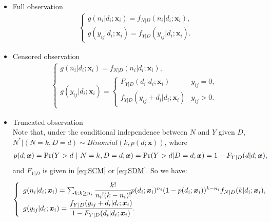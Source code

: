 \documentclass[11pt]{article}
\newcommand{\rev}[1]{{\color{blue}#1}}
\begin{document}
\begin{itemize}
        \item {Full observation}
        \begin{align} \label{eq:fr}
       	\left\{
       	\begin{array}{l}
       	g(n_i|d_i;\bm{x}_i) = f_{N|D}(n_i|d_i;\bm{x}_i), \\
	g(y_{ij}|d_i;\bm{x}_i) = f_{Y|D}({y_{ij}}|d_i;\bm{x}_i).
       	\end{array}
        \right.
       \end{align}
	\item {Censored observation}
       \begin{align} \label{eq:urc}
       	\left\{
       	\begin{array}{l}
       	g(n_i|d_i;\bm{x}_i) = f_{N|D}(n_i|d_i;\bm{x}_i), \\
	g(y_{ij}|d_i;\bm{x}_i)  = \left\{
	\begin{array}{ll}
		F_{Y|D}(d_i|d_i;\bm{x}_i) & y_{ij} = 0, \\
		f_{Y|D}(y_{ij}+d_i|d_i;\bm{x}_i) & y_{ij} > 0.
	\end{array}
	\right.
       	\end{array}
        \right.
       \end{align}
	\item {Truncated observation}\\
    Note {that, under the conditional independence between $N$ and $Y$ given $D$,} $N^*|(N=k,D=d) \sim Binomial (k,p(d;\bm{x}))$, where
\begin{align*}
	p(d;\bm{x}) = {\rm Pr}(Y>d\ |\ N=k,D=d;\bm{x}) = {\rm Pr}(Y>d|D=d;\bm{x}) = 1-F_{Y|D}(d|d;\bm{x})\rev{,}
\end{align*}
{and $F_{Y|D}$ is given in \eqref{eq:SCM} or \eqref{eq:SDM}.} So we have:
	       \begin{align} \label{eq:urt}
	       		\left\{
	       		\begin{array}{l}
		g(n_i|d_i;\bm{x}_i) = \sum_{k:k\ge n_i} \cfrac{k!}{n_i!(k-n_i)!} p(d_i;\bm{x}_i)^{n_i} (1-p(d_i;\bm{x}_i))^{k-n_i} f_{N|D}(k|d_i;\bm{x}_i), \\
	g(y_{ij}|d_i;\bm{x}_i)  = \cfrac{f_{Y|D}(y_{ij}+d_i|d_i;\bm{x}_i) }{1-F_{Y|D}(d_i|d_i;\bm{x}_i)}.
		\end{array}
		\right.
	\end{align}
\end{itemize}

\end{document}
